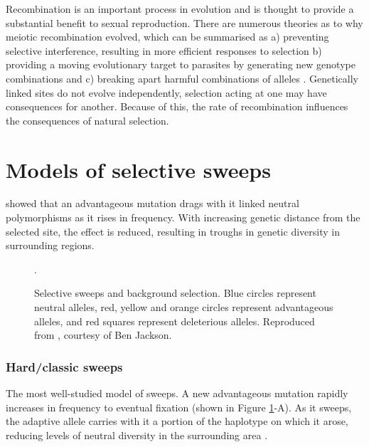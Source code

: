 	Recombination is an important process in evolution and is thought to provide a substantial benefit to sexual reproduction. There are numerous theories as to why meiotic recombination evolved, which can be summarised as a) preventing selective interference, resulting in more efficient responses to selection b) providing a moving evolutionary target to parasites by generating new genotype combinations and c) breaking apart harmful combinations of alleles \citep{RN389}. Genetically linked sites do not evolve independently, selection acting at one may have consequences for another. Because of this, the rate of recombination influences the consequences of natural selection.

\section[Models of selective sweeps]{Models of selective sweeps}

\cite{RN124} showed that an advantageous mutation drags with it linked neutral polymorphisms as it rises in frequency. With increasing genetic distance from the selected site, the effect is reduced, resulting in troughs in genetic diversity in surrounding regions.
 
 \begin{figure}[h!]
   \centering      
   \noindent{}
 \caption[Selective sweeps and background selection]{Selective sweeps and background selection. Blue circles represent neutral alleles, red, yellow and orange circles represent advantageous alleles, and red squares represent deleterious alleles. Reproduced from \cite{RN352}, courtesy of Ben Jackson.}.
 
 \label{fig:sweepCartoon}
\end{figure}


\subsubsection{Hard/classic sweeps} 
 
The most well-studied model of sweeps. A new advantageous mutation rapidly increases in frequency to eventual fixation (shown in Figure \ref{fig:sweepCartoon}-A). As it sweeps, the adaptive allele carries with it a portion of the haplotype on which it arose, reducing levels of neutral diversity in the surrounding area \citep{RN124,RN235}. 
 

